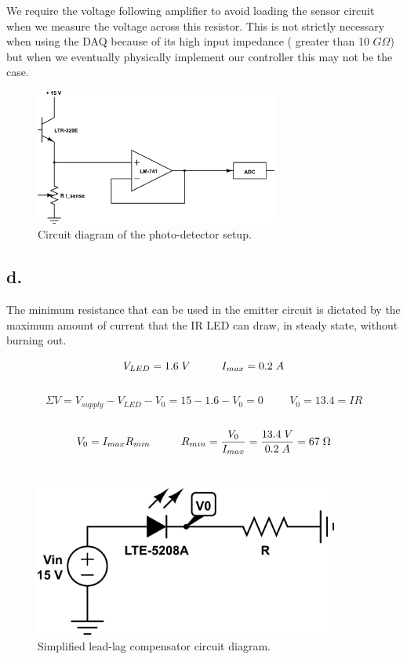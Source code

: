 \documentclass{article}
\theoremstyle{plain}
\theoremstyle{definition}
\theoremstyle{remark}
\begin{document}
We require the voltage following amplifier to avoid loading the sensor circuit when we measure the voltage across this resistor.  This is not strictly necessary when using the DAQ because of its high input impedance ( greater than 10 $G\Omega$) but when we eventually physically implement our controller this may not be the case.  


\begin{figure}[h]
\begin{center}
\includegraphics[width=8cm]{lab2_sensorckt.png}
\end{center}
\caption{Circuit diagram of the photo-detector setup.}
\label{q1_c}
\end{figure}


\subsection*{d.}
The minimum resistance that can be used in the emitter circuit is dictated by the maximum amount of current that the IR LED can draw, in steady state, without burning out.  

\begin{center}
$$ V_{LED}=1.6 \hspace{0.1cm} V \hspace{1cm} I_{max} = 0.2 \hspace{0.1cm} A $$ \\
$$ \Sigma{V} = V_{supply} - V_{LED} - V_0 = 15 - 1.6 - V_0 = 0 \hspace{1cm} V_0=13.4=IR $$\\
$$ V_0=I_{max}R_{min} \hspace{1cm} R_{min}=\frac{V_0}{I_{max}}=\frac{13.4 \hspace{0.1cm} V}{0.2 \hspace{0.1cm} A} = 67\hspace{0.1cm} \Omega$$\\
\end{center}

\begin{figure}[h]
\begin{center}
\includegraphics[width=10cm]{lab2_emitter.png}
\end{center}
\caption{Simplified lead-lag compensator circuit diagram.}
\label{q1_b}
\end{figure}
\end{document}
